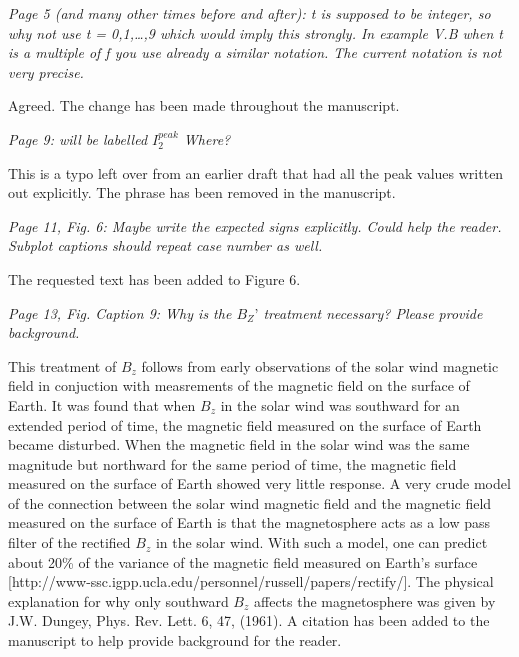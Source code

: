 \documentclass[a4paper,11pt]{article}
\begin{document}
\vspace{0.5cm}
{\em Page 5 (and many other times before and after): t is supposed to be
integer, so why not use t = 0,1,…,9 which would imply this strongly.
In example V.B when t is a multiple of f you use already a similar
notation. The current notation is not very precise.}
\vspace{0.5cm}

Agreed.  The change has been made throughout the manuscript.

\vspace{0.5cm}
{\em Page 9: will be labelled $I^{peak}_2$ Where?}
\vspace{0.5cm}

This is a typo left over from an earlier draft that had all the peak values written out explicitly.  The phrase has been removed in the manuscript.

\vspace{0.5cm}
{\em Page 11, Fig. 6: Maybe write the expected signs explicitly. Could help
the reader. Subplot captions should repeat case number as well.}
\vspace{0.5cm}

The requested text has been added to Figure 6.

\vspace{0.5cm}
{\em Page 13, Fig. Caption 9: Why is the $B_Z’$ treatment necessary? Please
provide background.}
\vspace{0.5cm}

This treatment of $B_z$ follows from early observations of the solar wind magnetic field in conjuction with measrements of the magnetic field on the surface of Earth.  It was found that when $B_z$ in the solar wind was southward for an extended period of time, the magnetic field measured on the surface of Earth became disturbed.  When the magnetic field in the solar wind was the same magnitude but northward for the same period of time, the magnetic field measured on the surface of Earth showed very little response.  A very crude model of the connection between the solar wind magnetic field and the magnetic field measured on the surface of Earth is that the magnetosphere acts as a low pass filter of the rectified $B_z$ in the solar wind.  With such a model, one can predict about 20\% of the variance of the magnetic field measured on Earth's surface [http://www-ssc.igpp.ucla.edu/personnel/russell/papers/rectify/].  The physical explanation for why only southward $B_z$ affects the magnetosphere was given by J.W. Dungey, Phys. Rev. Lett. 6, 47, (1961).  A citation has been added to the manuscript to help provide background for the reader.
\end{document}
